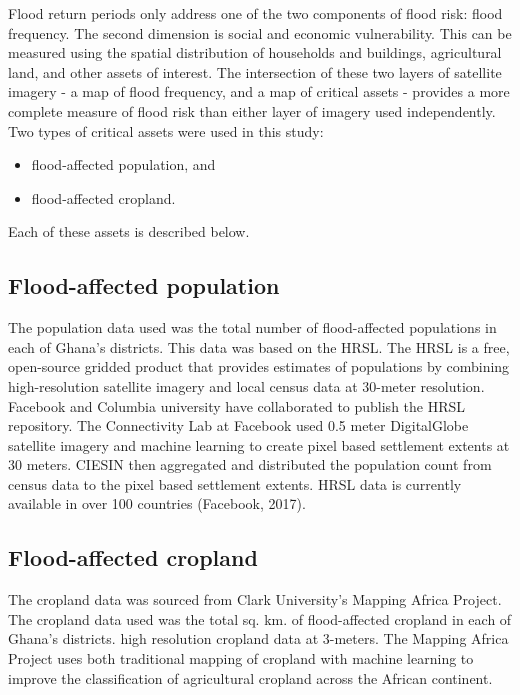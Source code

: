 Flood return periods only address one of the two components of flood risk: flood frequency. The second dimension is social and economic vulnerability. This can be measured using the spatial distribution of households and buildings, agricultural land, and other assets of interest. The intersection of these two layers of satellite imagery - a map of flood frequency, and a map of critical assets - provides a more complete measure of flood risk than either layer of imagery used independently. Two types of critical assets were used in this study:\\

\begin{itemize}
  \item flood-affected population, and
  \item flood-affected cropland.
\end{itemize}

Each of these assets is described below.

\subsection{Flood-affected population}

The population data used was the total number of flood-affected populations in each of Ghana’s districts. This data was based on the HRSL\cite{hrsl}. The HRSL is a free, open-source gridded product that provides estimates of populations by combining high-resolution satellite imagery and local census data at 30-meter resolution.\\

Facebook and Columbia university have collaborated to publish the HRSL repository. The Connectivity Lab at Facebook used 0.5 meter DigitalGlobe satellite imagery and machine learning to create pixel based settlement extents at 30 meters. CIESIN then aggregated and distributed the population count from census data to the pixel based settlement extents. HRSL data is currently available in over 100 countries (Facebook, 2017).

\subsection{Flood-affected cropland}

The cropland data was sourced from Clark University’s Mapping Africa Project\cite{mappingafrica}. The cropland data used was the total sq. km. of flood-affected cropland in each of Ghana’s districts. high resolution cropland data at 3-meters. The Mapping Africa Project uses both traditional mapping of cropland with machine learning to improve the classification of agricultural cropland across the African continent.

